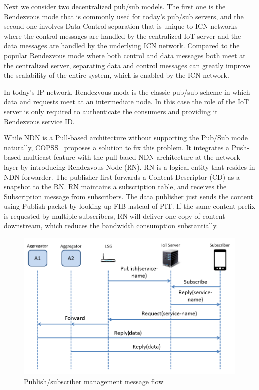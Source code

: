 Next we consider two decentralized pub/sub models.  The first one is the Rendezvous mode that is commonly used for today's pub/sub servers, and the second one involves Data-Control separation that is unique to ICN networks where the control messages are handled by the centralized IoT server and the data messages are handled by the underlying ICN network.  Compared to the popular Rendezvous mode where both control and data messages both meet at the centralized
server, separating data and control messages can greatly improve the scalability of the entire system, which is enabled by the ICN network.

In today's IP network, Rendezvous mode is the classic pub/sub scheme in which data and requests meet at an intermediate node.  In this case the role of the IoT server is only required to authenticate the consumers and providing it Rendezvous service ID.

While NDN is a Pull-based architecture without supporting the Pub/Sub mode naturally,  COPSS~\cite{chen2011copss} proposes a solution to fix this problem. It integrates a Push-based multicast feature with the pull based NDN architecture at the network layer by introducing Rendezvous Node (RN). RN is a logical entity that resides in NDN forwarder. The publisher first forwards a Content Descriptor (CD) as a snapshot to the RN. RN maintains a subscription table, and receives the Subscription message from subscribers. The data publisher just sends the content using Publish packet by looking up FIB instead of PIT. If the same content prefix is requested by multiple subscribers, RN will deliver one copy  of content downstream, which reduces the bandwidth consumption substantially.

\begin{figure}
\includegraphics[width=\columnwidth]{figure/pub_sub.png}
\caption{\label{fig:pubsub}Publish/subscriber management message flow}
\end{figure}

